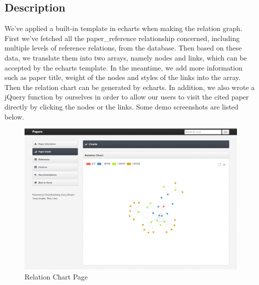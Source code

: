 \documentclass{book}
\begin{document}
\subsection{Description}

We've applied a built-in template in echarts when making the relation graph. First we've fetched all the paper\_reference relationship concerned, including multiple levels of reference relations, from the database. Then based on these data, we translate them into two arrays, namely nodes and links, which can be accepted by the echarts template. In the meantime, we add more information such as paper title, weight of the nodes and styles of the links into the array. Then the relation chart can be generated by echarts. In addition, we also wrote a jQuery function by ourselves in order to allow our users to visit the cited paper directly by clicking the nodes or the links. Some demo screenshots are listed below.

\begin{figure}[H]
\centering
\includegraphics[scale=0.4]{img/zlt_rel_demo.png}
\caption{Relation Chart Page}
\end{figure}
\end{document}

